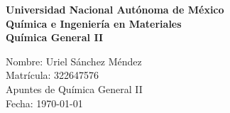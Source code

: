 \documentclass[12pt]{article}
\renewcommand{\headrulewidth}{0pt}
\newcommand{\activarEncabezado}[1]{%
  \fancyhead[L]{\small\textcolor{blueunam}{#1}}%
  \fancyhead[R]{\small\textcolor{blueunam}{\nouppercase{\leftmark}}}%
  \renewcommand{\headrulewidth}{0.4pt}%
  \renewcommand{\headrule}{\hbox to\headwidth{\color{blueunam}\leaders\hrule height \headrulewidth\hfill}}%
}
\begin{document}
\begin{titlepage}
\thispagestyle{empty}
\begin{center}
\vspace*{2cm}
\fontsize{14}{30}\selectfont\textbf{Universidad Nacional Autónoma de México} \\
\vspace{1cm}
\fontsize{14}{30}\selectfont\textbf{Química e Ingeniería en Materiales} \\
\vspace{1cm}
\fontsize{14}{30}\selectfont\textbf{Química General II} \\
\end{center}
\vspace{2cm}
\begin{flushright}
    \fontsize{14}{30}\selectfont
        \hspace{2cm} Nombre: Uriel Sánchez Méndez \\
        \hspace{2cm} Matrícula: 322647576 \\
        \hspace{2cm} Apuntes de Química General II \\
        \hspace{2cm} Fecha: \today \\
\end{flushright}
\end{titlepage}

\tableofcontents
\thispagestyle{empty}
\newpage






\end{document}
